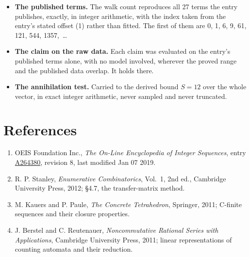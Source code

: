 \documentclass[11pt]{article}
\theoremstyle{definition}
\begin{document}
\begin{itemize}

\item {\bfseries The published terms.} The walk count reproduces all 27 terms the entry publishes, exactly, in integer arithmetic, with the index taken from the entry's stated offset (1) rather than fitted. The first of them are 0, 1, 6, 9, 61, 121, 544, 1357,~\dots

\item {\bfseries The claim on the raw data.} Each claim was evaluated on the entry's published terms alone, with no model involved, wherever the proved range and the published data overlap. It holds there.

\item {\bfseries The annihilation test.} Carried to the derived bound $S = 12$ over the whole vector, in exact integer arithmetic, never sampled and never truncated.

\end{itemize}

\section{References}

\begin{enumerate}

\item OEIS Foundation Inc., \emph{The On-Line Encyclopedia of Integer Sequences}, entry \href{https://oeis.org/A264380}{A264380}, revision 8, last modified Jan 07 2019.

\item R. P. Stanley, \emph{Enumerative Combinatorics}, Vol.~1, 2nd ed., Cambridge University Press, 2012; \S4.7, the transfer-matrix method.

\item M. Kauers and P. Paule, \emph{The Concrete Tetrahedron}, Springer, 2011; C-finite sequences and their closure properties.

\item J. Berstel and C. Reutenauer, \emph{Noncommutative Rational Series with Applications}, Cambridge University Press, 2011; linear representations of counting automata and their reduction.

\end{enumerate}
\end{document}
